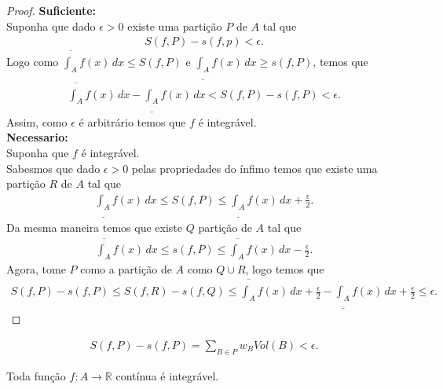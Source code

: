 \begin{proof} 
  \textbf{Suficiente:}\\
  Suponha que dado $\epsilon>0$ existe uma partição $P$ de $A$ tal que
  \begin{align*}
    S(f,P)-s(f,p)<\epsilon.
  \end{align*}
  Logo como $\overline{\int_{A}}f(x)\,dx\leq S(f,P)$ e $\underline{\int_{A}}f(x)\,dx\geq s(f,P)$, temos que
  \begin{align*}
    \overline{\int_A}f(x)\,dx-\underline{\int_{A}}f(x)\,dx<S(f,P)-s(f,P)<\epsilon. 
  \end{align*}
  Assim, como $\epsilon$ é arbitrário temos que $f$ é integrável.\\
  \textbf{Necessario:}\\
  Suponha que $f$ é integrável.\\
  Sabesmos que dado $\epsilon>0$ pelas propriedades do ínfimo temos que existe uma partição $R$ de $A$ tal que
  \begin{align*}
    \underline{\int_A}f(x)\,dx\leq S(f,P)\leq \underline{\int_A}f(x)\,dx + \frac{\epsilon}{2}.
  \end{align*}
  Da mesma maneira temos que existe $Q$ partição de $A$ tal que
  \begin{align*}
    \overline{\int_A}f(x)\,dx\leq s(f,P)\leq \overline{\int_A}f(x)\,dx-\frac{\epsilon}{2}.
  \end{align*}
  Agora, tome $P$ como a partição de $A$ como $Q\cup R$, logo temos que
  \begin{align*}
    S(f,P)-s(f,P)\leq S(f,R)-s(f,Q)\leq \overline{\int_A}f(x)\,dx+\frac{\epsilon}{2}-\underline{\int_A}f(x)\,dx+\frac{\epsilon}{2}\leq \epsilon.
  \end{align*}
\end{proof}
\begin{note}
  \begin{align*}
    S(f,P)-s(f,P)=\sum_{B\in P}w_{B}Vol(B)<\epsilon.
  \end{align*}
\end{note}
\begin{theorem}
  Toda função $f:A\to\mathbb{R}$ contínua é integrável.
\end{theorem}
